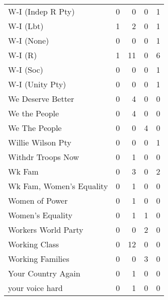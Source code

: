 \begin{supertabular}{lrrrr}
W-I (Indep R Pty) & 0 & 0 & 0 & 1\\
W-I (Lbt) & 1 & 2 & 0 & 1\\
W-I (None) & 0 & 0 & 0 & 1\\
W-I (R) & 1 & 11 & 0 & 6\\
W-I (Soc) & 0 & 0 & 0 & 1\\
W-I (Unity Pty) & 0 & 0 & 0 & 1\\
We Deserve Better & 0 & 4 & 0 & 0\\
We the People & 0 & 4 & 0 & 0\\
We The People & 0 & 0 & 4 & 0\\
Willie Wilson Pty & 0 & 0 & 0 & 1\\
Withdr Troops Now & 0 & 1 & 0 & 0\\
Wk Fam & 0 & 3 & 0 & 2\\
Wk Fam, Women's Equality & 0 & 1 & 0 & 0\\
Women of Power & 0 & 1 & 0 & 0\\
Women's Equality & 0 & 1 & 1 & 0\\
Workers World Party & 0 & 0 & 2 & 0\\
Working Class & 0 & 12 & 0 & 0\\
Working Families & 0 & 0 & 3 & 0\\
Your Country Again & 0 & 1 & 0 & 0\\
your voice hard & 0 & 1 & 0 & 0\\
\bottomrule
\end{supertabular}
